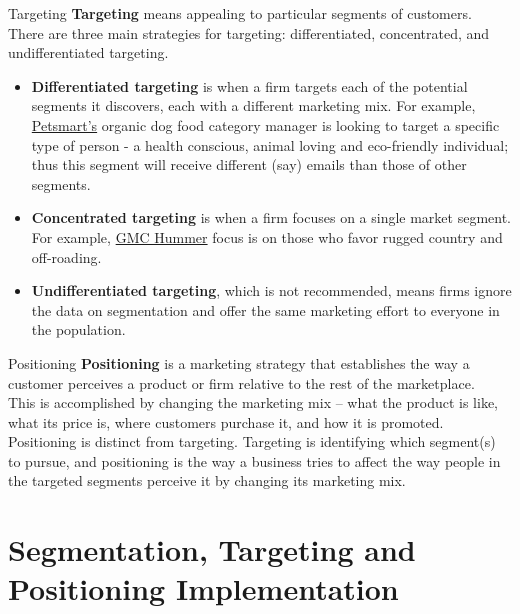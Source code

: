 \documentclass[pdf]{beamer}
\newcommand{\empr}[1]{{\color{franklinblue}\textbf{#1}}}
\theoremstyle{remark}
\theoremstyle{definition}
\begin{document}
\begin{frame}[t]{Targeting }
\empr{Targeting} means appealing to particular segments of customers.  There are three main strategies for targeting: differentiated, concentrated, and undifferentiated targeting. \\
\vspace{1.5ex}
\small
\begin{itemize}
  \item \empr{Differentiated targeting} is when a firm targets each of the potential segments it discovers, each with a different marketing mix. For example, \href{https://www.petsmart.com/}{Petsmart's} organic dog food category manager is looking to target a specific type of person - a health conscious, animal loving and eco-friendly individual;  thus this segment will receive different (say) emails than those of other segments. 
 \item \empr{Concentrated targeting} is when a firm focuses on a single market segment. For example, \href{https://www.gmc.com/electric/hummer-ev}{GMC Hummer} focus is on those who favor rugged country and off-roading. 
 \item \empr{Undifferentiated targeting}, which is not recommended, means firms ignore the data on segmentation and offer the same marketing effort to everyone in the population. 
\end{itemize}
\end{frame}

\begin{frame}[t]{Positioning}
\empr{Positioning} is a marketing strategy that establishes the way a customer perceives a product or firm relative to the rest of the marketplace. \\
\vspace{1.5ex} 
This is accomplished by changing the marketing mix -- what the product is like, what its price is, where customers purchase it, and how it is promoted. \\
\vspace{1.5ex}
 Positioning is distinct from targeting. Targeting is identifying which segment(s) to pursue, and positioning is the way a business tries to affect the way people in the targeted segments perceive it by changing its marketing mix.
\end{frame}

\section{Segmentation, Targeting and Positioning Implementation}
\end{document}
